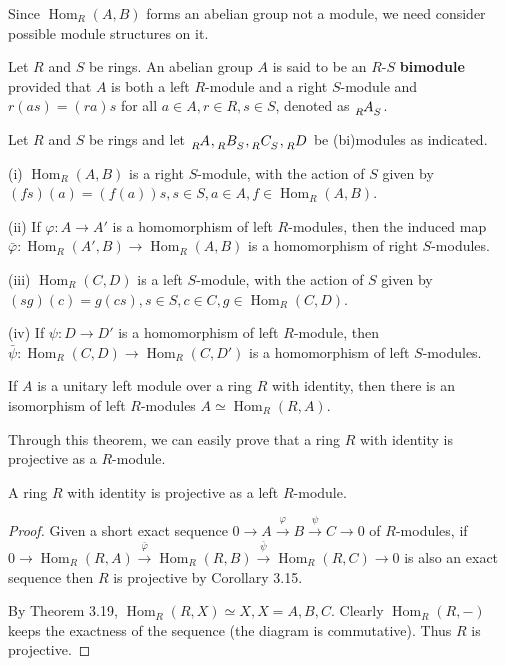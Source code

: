\documentclass{article}
\DeclareMathOperator{\Hom}{Hom}
\begin{document}
Since $\Hom_{R}(A, B)$ forms an abelian group not a module, we need consider possible module structures on it.

Let $R$ and $S$ be rings. An abelian group $A$ is said to be an $R$-$S$ \textbf{bimodule} provided that $A$ is both a left $R$-module and a right $S$-module and $r(as)=(ra)s$ for all $a \in A, r\in R, s \in S$, denoted as $\tensor[_R]{A}{_S}$.

\begin{theorem}
    Let $R$ and $S$ be rings and let $\tensor[_R]{A}{}, \tensor[_R]{B}{_S}, \tensor[_R]{C}{_S}, \tensor[_R]{D}{}$ be (bi)modules as indicated.

    (i) $\Hom_{R}(A, B)$ is a right $S$-module, with the action of $S$ given by $(fs)(a)=(f(a))s,s \in S, a \in A, f \in \Hom_{R}(A, B)$.

    (ii) If $\varphi:A\to A'$ is a homomorphism of left $R$-modules, then the induced map $\bar{\varphi}:\Hom_{R}(A', B)\to \Hom_{R}(A, B)$ is a homomorphism of right $S$-modules.

    (iii) $\Hom_{R}(C, D)$  is a left $S$-module, with the action of $S$ given by $(sg)(c)=g(cs), s \in S, c \in C, g \in \Hom_{R}(C, D)$.

    (iv) If $\psi:D\to D'$ is a homomorphism of left $R$-module, then $\bar{\psi}:\Hom_{R}(C, D)\to \Hom_{R}(C, D')$ is a homomorphism of left $S$-modules.
\end{theorem}

\begin{theorem}
    If $A$ is a unitary left module over a ring $R$ with identity, then there is an isomorphism of left $R$-modules $A \simeq \Hom_{R}(R, A)$.
\end{theorem}

Through this theorem, we can easily prove that a ring $R$ with identity is projective as a $R$-module.

\begin{corollary}
    A ring $R$ with identity is projective as a left $R$-module.
\end{corollary}
\begin{proof}
    Given a short exact sequence $0\to A\xrightarrow{\varphi}B\xrightarrow{\psi}C\to 0$ of $R$-modules, if $0\to \Hom_{R}(R, A)\xrightarrow{\bar{\varphi}}\Hom_{R}(R, B)\xrightarrow{\bar{\psi}}\Hom_{R}(R, C)\to 0$ is also an exact sequence then $R$ is projective by Corollary 3.15.
    
    By Theorem 3.19, $\Hom_{R}(R, X)\simeq X, X=A,B,C$. Clearly $\Hom_{R}(R, -)$ keeps the exactness of the sequence (the diagram is commutative). Thus $R$ is projective. 
\end{proof}
\end{document}
